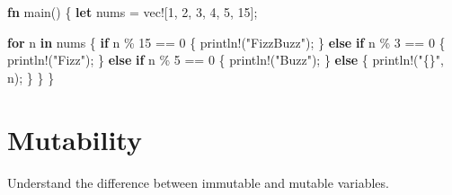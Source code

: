 \documentclass[
  letterpaper,
  DIV=11,
  numbers=noendperiod,
  oneside]{scrreprt}
\newenvironment{Shaded}{\begin{snugshade}}{\end{snugshade}}
\newcommand{\ControlFlowTok}[1]{\textcolor[rgb]{0.00,0.23,0.31}{\textbf{#1}}}
\newcommand{\DecValTok}[1]{\textcolor[rgb]{0.68,0.00,0.00}{#1}}
\newcommand{\KeywordTok}[1]{\textcolor[rgb]{0.00,0.23,0.31}{\textbf{#1}}}
\newcommand{\NormalTok}[1]{\textcolor[rgb]{0.00,0.23,0.31}{#1}}
\newcommand{\OperatorTok}[1]{\textcolor[rgb]{0.37,0.37,0.37}{#1}}
\newcommand{\PreprocessorTok}[1]{\textcolor[rgb]{0.68,0.00,0.00}{#1}}
\newcommand{\StringTok}[1]{\textcolor[rgb]{0.13,0.47,0.30}{#1}}
\begin{document}
\begin{Shaded}
\begin{Highlighting}[]
\KeywordTok{fn}\NormalTok{ main() }\OperatorTok{\{}
    \KeywordTok{let}\NormalTok{ nums }\OperatorTok{=} \PreprocessorTok{vec!}\NormalTok{[}\DecValTok{1}\OperatorTok{,} \DecValTok{2}\OperatorTok{,} \DecValTok{3}\OperatorTok{,} \DecValTok{4}\OperatorTok{,} \DecValTok{5}\OperatorTok{,} \DecValTok{15}\NormalTok{]}\OperatorTok{;}

    \ControlFlowTok{for}\NormalTok{ n }\KeywordTok{in}\NormalTok{ nums }\OperatorTok{\{}
        \ControlFlowTok{if}\NormalTok{ n }\OperatorTok{\%} \DecValTok{15} \OperatorTok{==} \DecValTok{0} \OperatorTok{\{}
            \PreprocessorTok{println!}\NormalTok{(}\StringTok{"FizzBuzz"}\NormalTok{)}\OperatorTok{;}
        \OperatorTok{\}} \ControlFlowTok{else} \ControlFlowTok{if}\NormalTok{ n }\OperatorTok{\%} \DecValTok{3} \OperatorTok{==} \DecValTok{0} \OperatorTok{\{}
            \PreprocessorTok{println!}\NormalTok{(}\StringTok{"Fizz"}\NormalTok{)}\OperatorTok{;}
        \OperatorTok{\}} \ControlFlowTok{else} \ControlFlowTok{if}\NormalTok{ n }\OperatorTok{\%} \DecValTok{5} \OperatorTok{==} \DecValTok{0} \OperatorTok{\{}
            \PreprocessorTok{println!}\NormalTok{(}\StringTok{"Buzz"}\NormalTok{)}\OperatorTok{;}
        \OperatorTok{\}} \ControlFlowTok{else} \OperatorTok{\{}
            \PreprocessorTok{println!}\NormalTok{(}\StringTok{"\{\}"}\OperatorTok{,}\NormalTok{ n)}\OperatorTok{;}
        \OperatorTok{\}}
    \OperatorTok{\}}
\OperatorTok{\}}
\end{Highlighting}
\end{Shaded}

\chapter{Mutability}\label{mutability}

\begin{tcolorbox}[enhanced jigsaw, titlerule=0mm, coltitle=black, opacitybacktitle=0.6, bottomrule=.15mm, bottomtitle=1mm, colframe=quarto-callout-tip-color-frame, toprule=.15mm, opacityback=0, rightrule=.15mm, leftrule=.75mm, breakable, left=2mm, colback=white, colbacktitle=quarto-callout-tip-color!10!white, toptitle=1mm, title=\textcolor{quarto-callout-tip-color}{\faLightbulb}\hspace{0.5em}{Tip}, arc=.35mm]

Understand the difference between immutable and mutable variables.

\end{tcolorbox}
\end{document}
